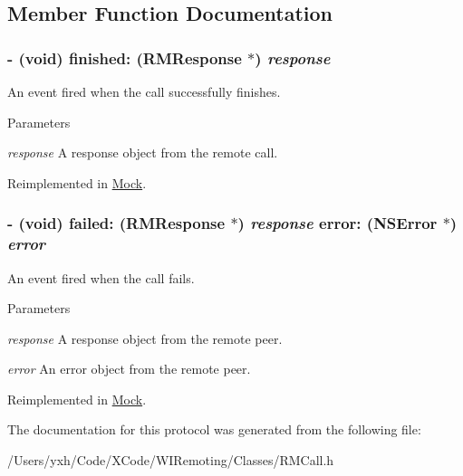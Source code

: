 \subsection{Member Function Documentation}
\hypertarget{protocol_r_m_result_delegate-p_a965fe7cc4e150bb6ecf7cbb02b9c7248}{
\subsubsection[{finished:}]{\setlength{\rightskip}{0pt plus 5cm}-\/ (void) finished: ({\bf RMResponse} $\ast$) {\em response}}}
\label{protocol_r_m_result_delegate-p_a965fe7cc4e150bb6ecf7cbb02b9c7248}


An event fired when the call successfully finishes. 
\begin{DoxyParams}{Parameters}
\item[{\em response}]A response object from the remote call. \end{DoxyParams}


Reimplemented in \hyperlink{interface_mock_ab15e59579bf7b5c5de900d28374062b7}{Mock}.\hypertarget{protocol_r_m_result_delegate-p_a3521cd9555449b32aabdb759d2dadce5}{
\subsubsection[{failed:error:}]{\setlength{\rightskip}{0pt plus 5cm}-\/ (void) failed: ({\bf RMResponse} $\ast$) {\em response}\/ error: (NSError $\ast$) {\em error}}}
\label{protocol_r_m_result_delegate-p_a3521cd9555449b32aabdb759d2dadce5}


An event fired when the call fails. 
\begin{DoxyParams}{Parameters}
\item[{\em response}]A response object from the remote peer. \item[{\em error}]An error object from the remote peer. \end{DoxyParams}


Reimplemented in \hyperlink{interface_mock_ae57e780c8ddcf5c4c79af12c54d58cff}{Mock}.

The documentation for this protocol was generated from the following file:\begin{DoxyCompactItemize}
\item 
/Users/yxh/Code/XCode/WIRemoting/Classes/RMCall.h\end{DoxyCompactItemize}
